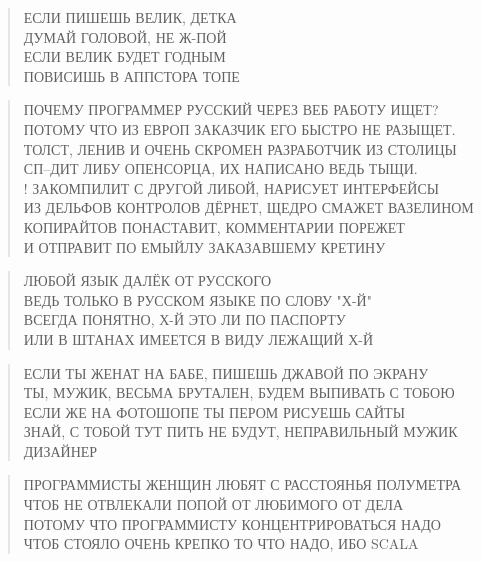\poemtitle{***}
\begin{verse}
ЕСЛИ ПИШЕШЬ ВЕЛИК, ДЕТКА\\
ДУМАЙ ГОЛОВОЙ, НЕ Ж-ПОЙ\\
ЕСЛИ ВЕЛИК БУДЕТ ГОДНЫМ\\
ПОВИСИШЬ В АППСТОРА ТОПЕ
\end{verse}

\poemtitle{***}
\begin{verse}
ПОЧЕМУ ПРОГРАММЕР РУССКИЙ ЧЕРЕЗ ВЕБ РАБОТУ ИЩЕТ?\\
ПОТОМУ ЧТО ИЗ ЕВРОП ЗАКАЗЧИК ЕГО БЫСТРО НЕ РАЗЫЩЕТ.\\
ТОЛСТ, ЛЕНИВ И ОЧЕНЬ СКРОМЕН РАЗРАБОТЧИК ИЗ СТОЛИЦЫ\\
СП--ДИТ ЛИБУ ОПЕНСОРЦА, ИХ НАПИСАНО ВЕДЬ ТЫЩИ.\\!
ЗАКОМПИЛИТ С ДРУГОЙ ЛИБОЙ, НАРИСУЕТ ИНТЕРФЕЙСЫ\\
ИЗ ДЕЛЬФОВ КОНТРОЛОВ ДЁРНЕТ, ЩЕДРО СМАЖЕТ ВАЗЕЛИНОМ\\
КОПИРАЙТОВ ПОНАСТАВИТ, КОММЕНТАРИИ ПОРЕЖЕТ\\
И ОТПРАВИТ ПО ЕМЫЙЛУ ЗАКАЗАВШЕМУ КРЕТИНУ
\end{verse}

\poemtitle{***}
\begin{verse}
ЛЮБОЙ ЯЗЫК ДАЛЁК ОТ РУССКОГО\\
ВЕДЬ ТОЛЬКО В РУССКОМ ЯЗЫКЕ ПО СЛОВУ "Х-Й"\\
ВСЕГДА ПОНЯТНО, Х-Й ЭТО ЛИ ПО ПАСПОРТУ\\
ИЛИ В ШТАНАХ ИМЕЕТСЯ В ВИДУ ЛЕЖАЩИЙ Х-Й
\end{verse}

\poemtitle{***}
\begin{verse}
ЕСЛИ ТЫ ЖЕНАТ НА БАБЕ, ПИШЕШЬ ДЖАВОЙ ПО ЭКРАНУ\\
ТЫ, МУЖИК, ВЕСЬМА БРУТАЛЕН, БУДЕМ ВЫПИВАТЬ С ТОБОЮ\\
ЕСЛИ ЖЕ НА ФОТОШОПЕ ТЫ ПЕРОМ РИСУЕШЬ САЙТЫ\\
ЗНАЙ, С ТОБОЙ ТУТ ПИТЬ НЕ БУДУТ, НЕПРАВИЛЬНЫЙ МУЖИК ДИЗАЙНЕР
\end{verse}

\poemtitle{***}
\begin{verse}
ПРОГРАММИСТЫ ЖЕНЩИН ЛЮБЯТ С РАССТОЯНЬЯ ПОЛУМЕТРА\\
ЧТОБ НЕ ОТВЛЕКАЛИ ПОПОЙ ОТ ЛЮБИМОГО ОТ ДЕЛА\\
ПОТОМУ ЧТО ПРОГРАММИСТУ КОНЦЕНТРИРОВАТЬСЯ НАДО\\
ЧТОБ СТОЯЛО ОЧЕНЬ КРЕПКО ТО ЧТО НАДО, ИБО SCALA
\end{verse}

